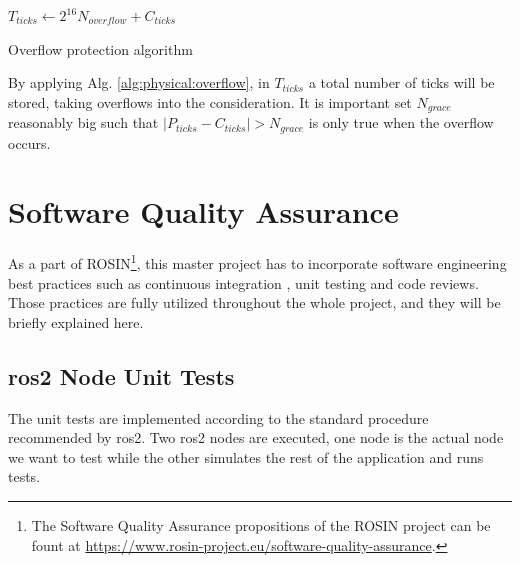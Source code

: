 \vspace*{.4cm}
\begin{algorithm}[H]

$ T_{ticks} \leftarrow 2^{16} N_{overflow} + C_{ticks} $\;

\caption{Overflow protection algorithm}
\label{alg:physical:overflow}
\end{algorithm}
\vspace*{.4cm}

By applying Alg. \ref{alg:physical:overflow}, in $ T_{ticks} $ a total number of ticks will be stored, taking overflows into the consideration. It is important set $ N_{grace} $ reasonably big such that $ |P_{ticks} - C_{ticks}| > N_{grace} $ is only true when the overflow occurs.

\section{Software Quality Assurance}
As a part of ROSIN\footnote{The Software Quality Assurance propositions of the ROSIN project can be fount at \url{https://www.rosin-project.eu/software-quality-assurance}.}, this master project has to incorporate software engineering best practices such as continuous integration \cite{meyer_continuous_2014}, unit testing and code reviews. Those practices are fully utilized throughout the whole project, and they will be briefly explained here.

\subsection{\ac{ros2} Node Unit Tests}

The unit tests are implemented according to the standard procedure recommended by \ac{ros2}.
Two \ac{ros2} nodes are executed, one node is the actual node we want to test while the other simulates the rest of the application and runs tests. 


